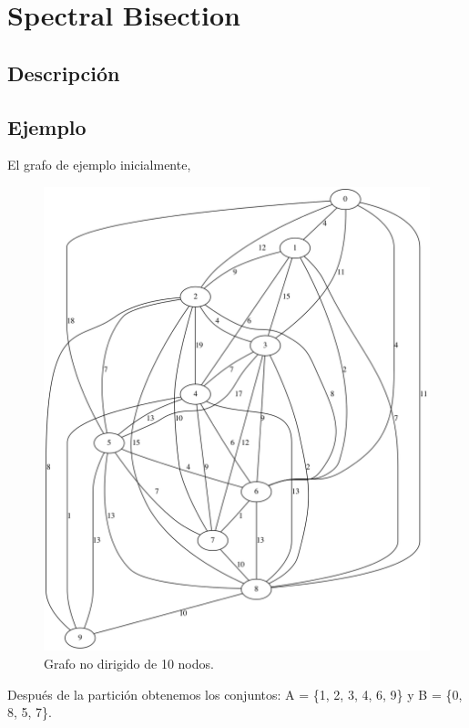 \section{Spectral Bisection}\label{Spectral-Bisection}

\subsection{Descripción}

\subsection{Ejemplo}

El grafo de ejemplo inicialmente,

\renewcommand{\figurename}{Figura}
\begin{figure}[h]
	\centering
	\includegraphics[scale=0.25]{Figures/10_dataset}
	\vspace{1mm}
	\caption{Grafo no dirigido de 10 nodos.}
	\label{grafo_2}
\end{figure}

Después de la partición obtenemos los conjuntos: A = \{1, 2, 3, 4, 6, 9\} y B = \{0, 8, 5, 7\}.

